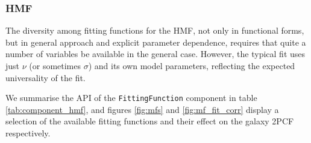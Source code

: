 \documentclass[5p]{elsarticle}
\begin{document}

\subsubsection{HMF}
\label{sec:halomod:components:hmf}
The diversity among fitting functions for the HMF, not only in functional forms, but in general approach and explicit parameter dependence, requires that quite a number of variables be available in the general case. However, the typical fit uses just $\nu$ (or sometimes $\sigma$) and its own model parameters, reflecting the expected universality of the fit. 

%

We summarise the API of the \verb|FittingFunction| component in table \ref{tab:component_hmf}, and figures \ref{fig:mfs} and \ref{fig:mf_fit_corr} display a selection of the available fitting functions and their effect on the galaxy 2PCF respectively.

\end{document}
